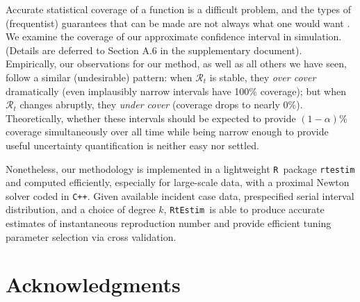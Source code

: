 \documentclass[10pt,letterpaper]{article}
\newcommand{\R}{\texttt{R}}
\newcommand{\cpp}{\texttt{C++}}
\def\RtEstim{\texttt{RtEstim}}
\begin{document}
Accurate statistical coverage of a function is a difficult problem, and the
types of (frequentist) guarantees that can be made are not always what one
would want \cite{genovese2008adaptive}. We examine the coverage of our 
approximate confidence interval in simulation. (Details are deferred to Section A.6 
in the supplementary document). Empirically, our observations for our method, as well 
as all others we have seen, follow a similar (undesirable) pattern: when 
$\mathcal{R}_t$ is stable, they \emph{over cover} dramatically (even implausibly 
narrow intervals have 100\% coverage); but when $\mathcal{R}_t$ changes abruptly, 
they \emph{under cover} (coverage drops to nearly 0\%). 
Theoretically, whether these intervals should be expected to provide $(1-\alpha)\%$ 
coverage simultaneously over all time while being narrow enough to provide useful
uncertainty quantification is neither easy nor settled. 


Nonetheless, our methodology is implemented in a lightweight \R\ package 
\texttt{rtestim} and computed efficiently, especially for large-scale data, 
with a proximal Newton solver coded in \cpp. 
Given available incident case data, prespecified serial interval
distribution, and a choice of degree $k$, \RtEstim\ is able to produce
accurate estimates of instantaneous reproduction number and provide efficient
tuning parameter selection via cross validation. 


%
%


\section*{Acknowledgments}
\end{document}
